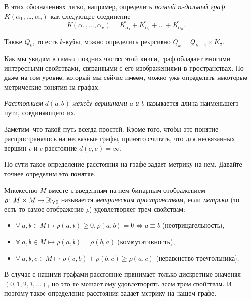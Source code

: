 	В этих обозначениях легко, например, определить \emph{полный $n$-дольный граф $K(\alpha_1, \dots, \alpha_n)$} как следующее соединение
	$$K(\alpha_1, \dots, \alpha_n) = \overline{K_{\alpha_1}} + \overline{K_{\alpha_2}} + \dots + \overline{K_{\alpha_n}}.$$
	
	Также $Q_k$, то есть $k$-кубы, можно определить рекрсивно $Q_k = Q_{k-1} \times K_2$. 
	

	Как мы увидим в самых поздних частях этой книги, граф обладает многими интересными свойствами, связанными с его изображениями в пространствах. Но даже на том уровне, который мы сейчас имеем, можно уже определить некоторые метрические понятия на графах.

\begin{definition}
	\emph{Расстоянием $d(a, b)$ между вершинами $a$ и $b$} называется длина наименьшего пути, соединяющего их.
\end{definition}
	
	Заметим, что такой путь всегда простой. Кроме того, чтобы это понятие распространялось на несвязные графы, принято считать, что для несвязанных вершин $c$ и $e$ расстояние $d(c, e) = \infty$.

	По сути такое определение расстояния на графе задает метрику на нем. Давайте точнее определим это понятие.
	
\begin{definition}
	Множество $M$ вместе с введенным на нем бинарным отображением $\rho \colon M \times M \to \mathbb{R}_{\geqslant 0}$ называется \emph{метрическим пространством}, если \emph{метрика} (то есть то самое отображение $\rho$) удовлетворяет трем свойствам:
	\begin{itemize}
		\item $\forall \!\ a, b \in M \mapsto \rho (a, b) \geqslant 0, \rho (a, b) = 0 \Leftrightarrow a \equiv b$ (неотрицательность),
		\item $\forall \!\ a, b \in M \mapsto \rho (a, b) = \rho (b, a)$ (коммутативность),
		\item $\forall \!\ a, b, c \in M \mapsto \rho (a, b) + \rho (b, c) \geqslant \rho (a, c)$ (неравенство треугольника).
	\end{itemize}
\end{definition}

	В случае с нашими графами расстояние принимает только дискретные значения $(0, 1, 2, 3, \dots)$, но это не мешает ему удовлетворять всем трем свойствам. И поэтому такое определение расстояния задает метрику на нашем графе.
	
